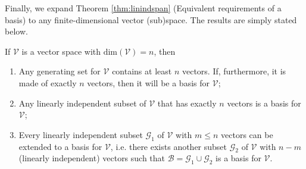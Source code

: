 Finally, we expand Theorem \ref{thm:linindspan} (Equivalent requirements of a basis) to any finite-dimensional vector (sub)space. The results are simply stated below.
\begin{proper}
\label{proper:linindspanbasisnewver}
If $\mathcal{V}$ is a vector space with $\text{dim}(\mathcal{V}) = n$, then
\begin{enumerate}[label=(\alph*)]
    \item Any generating set for $\mathcal{V}$ contains at least $n$ vectors. If, furthermore, it is made of exactly $n$ vectors, then it will be a basis for $\mathcal{V}$;
    \item Any linearly independent subset of $\mathcal{V}$ that has exactly $n$ vectors is a basis for $\mathcal{V}$;
    \item Every linearly independent subset $\mathcal{G}_1$ of $\mathcal{V}$ with $m \leq n$ vectors can be extended to a basis for $\mathcal{V}$, i.e. there exists another subset $\mathcal{G}_2$ of $\mathcal{V}$ with $n-m$ (linearly independent) vectors such that $\mathcal{B} = \mathcal{G}_1 \cup \mathcal{G}_2$ is a basis for $\mathcal{V}$.
\end{enumerate}
\end{proper}
